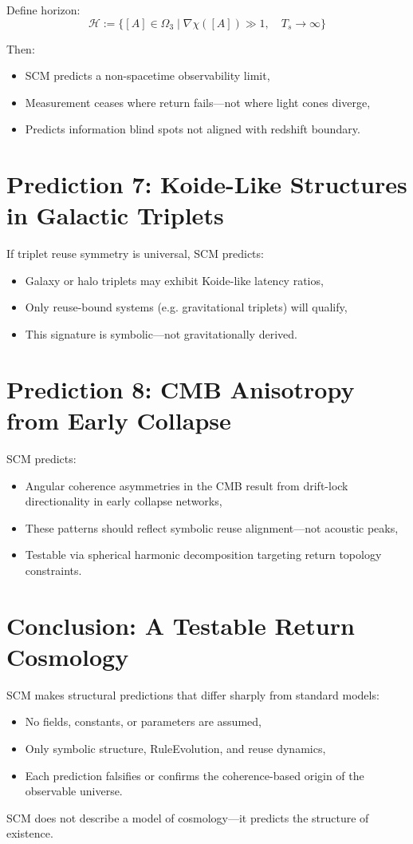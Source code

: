 Define horizon:
\[
\mathcal{H} := \{ [A] \in \Omega_3 \mid \nabla\chi([A]) \gg 1,\quad T_s \to \infty \}
\]

Then:
\begin{itemize}
  \item SCM predicts a non-spacetime observability limit,
  \item Measurement ceases where return fails—not where light cones diverge,
  \item Predicts information blind spots not aligned with redshift boundary.
\end{itemize}

\section{Prediction 7: Koide-Like Structures in Galactic Triplets} \label{sec:macro-koide}

If triplet reuse symmetry is universal, SCM predicts:
\begin{itemize}
  \item Galaxy or halo triplets may exhibit Koide-like latency ratios,
  \item Only reuse-bound systems (e.g. gravitational triplets) will qualify,
  \item This signature is symbolic—not gravitationally derived.
\end{itemize}

\section{Prediction 8: CMB Anisotropy from Early Collapse} \label{sec:cmb-anisotropy}

SCM predicts:
\begin{itemize}
  \item Angular coherence asymmetries in the CMB result from drift-lock directionality in early collapse networks,
  \item These patterns should reflect symbolic reuse alignment—not acoustic peaks,
  \item Testable via spherical harmonic decomposition targeting return topology constraints.
\end{itemize}

\section{Conclusion: A Testable Return Cosmology} \label{sec:predictions-summary}

SCM makes structural predictions that differ sharply from standard models:
\begin{itemize}
  \item No fields, constants, or parameters are assumed,
  \item Only symbolic structure, RuleEvolution, and reuse dynamics,
  \item Each prediction falsifies or confirms the coherence-based origin of the observable universe.
\end{itemize}

SCM does not describe a model of cosmology—it predicts the structure of existence.

